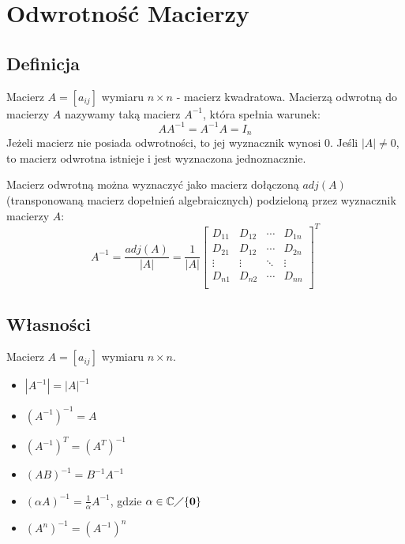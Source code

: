\documentclass{article}
\begin{document}
\section{Odwrotność Macierzy}
\subsection{Definicja}
Macierz $A = [a_{ij}]$ wymiaru $n \times n$ - macierz kwadratowa.
Macierzą odwrotną do macierzy $A$ nazywamy taką macierz $A^{-1}$,
która spełnia warunek:
$$
    AA^{-1} = A^{-1}A = I_{n}
$$
Jeżeli macierz nie posiada odwrotności, to jej wyznacznik wynosi $0$.
Jeśli $|A| \neq 0$, to macierz odwrotna istnieje i jest wyznaczona
jednoznacznie.

Macierz odwrotną można wyznaczyć jako macierz dołączoną $adj(A)$
(transponowaną macierz dopełnień algebraicznych) podzieloną
przez wyznacznik macierzy $A$:
$$
    A^{-1} = \frac{adj(A)}{|A|}
    =
    \frac{1}{|A|}
    \begin{bmatrix} D_{11}  & D_{12}    & \cdots    & D_{1n}    \\
                    D_{21}  & D_{12}    & \cdots    & D_{2n}    \\
                    \vdots  & \vdots    & \ddots    & \vdots    \\
                    D_{n1}  & D_{n2}    & \cdots    & D_{nn}    \\
    \end{bmatrix}^{T}
$$
\subsection{Własności}
Macierz $A = [a_{ij}]$ wymiaru $n \times n$.
\begin{itemize}
    \item $|A^{-1}| = |A|^{-1}$
    \item $(A^{-1})^{-1} = A$
    \item $(A^{-1})^{T} = (A^{T})^{-1}$
    \item $(AB)^{-1} = B^{-1}A^{-1}$
    \item $(\alpha A)^{-1} = \frac{1}{\alpha}A^{-1}$,
        gdzie $\alpha \in \mathbb{C} \diagup \{\mathbf{0}\}$
    \item $(A^{n})^{-1} = (A^{-1})^{n}$
\end{itemize}
\end{document}
